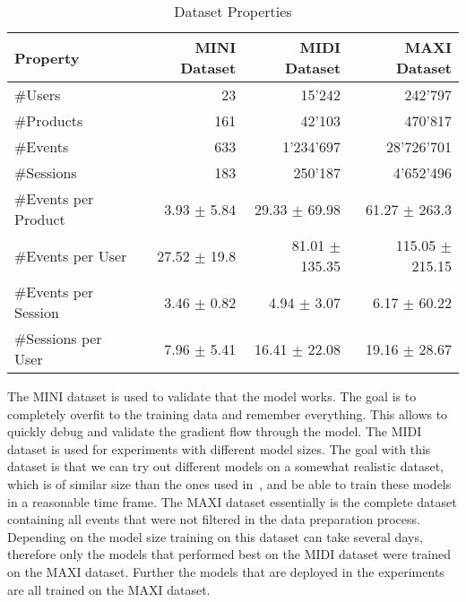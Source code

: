 \begin{table}[ht]
    \centering
    \begin{tabular}{lrrr}\toprule
        \textbf{Property} & \textbf{MINI Dataset} & \textbf{MIDI Dataset} & \textbf{MAXI Dataset} \\ \midrule
        \#Users & 23 & 15'242 & 242'797 \\
        \#Products & 161 & 42'103 & 470'817 \\
        \#Events & 633 & 1'234'697 & 28'726'701 \\
        \#Sessions & 183 & 250'187 & 4'652'496 \\ \midrule
        \#Events per Product & 3.93 $\pm$ 5.84 & 29.33 $\pm$ 69.98 & 61.27 $\pm$ 263.3 \\
        \#Events per User & 27.52 $\pm$ 19.8 & 81.01 $\pm$ 135.35 & 115.05 $\pm$ 215.15 \\
        \#Events per Session & 3.46 $\pm$ 0.82 & 4.94 $\pm$ 3.07 & 6.17 $\pm$ 60.22 \\ 
        \#Sessions per User & 7.96 $\pm$ 5.41 & 16.41 $\pm$ 22.08 & 19.16 $\pm$ 28.67 \\ \bottomrule
    \end{tabular}
    \caption{Dataset Properties}
    \label{tab:dataset_stats}
\end{table}

The MINI dataset is used to validate that the model works. 
The goal is to completely overfit to the training data and remember everything.
This allows to quickly debug and validate the gradient flow through the model.
The MIDI dataset is used for experiments with different model sizes.
The goal with this dataset is that we can try out different models on a somewhat realistic dataset, which is of similar size than the ones used in~\cite{hierarchical}, and be able to train these models in a reasonable time frame.
The MAXI dataset essentially is the complete dataset containing all events that were not filtered in the data preparation process.
Depending on the model size training on this dataset can take several days, therefore only the models that performed best on the MIDI dataset were trained on the MAXI dataset.
Further the models that are deployed in the experiments are all trained on the MAXI dataset.